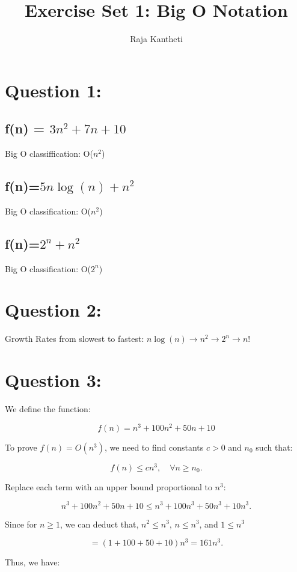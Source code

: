 \documentclass[12pt]{article}
\begin{document}
\title{Exercise Set 1: Big O Notation}
\author{Raja Kantheti}
\date{}
\maketitle

\section{Question 1: }
\subsection*{ f(n) = $3n^2 + 7n + 10$}
Big O classiffication: O($n^2$)
\subsection*{f(n)=$5n\log(n)+n^2$}
Big O classification: O($n^2$)
\subsection*{f(n)=$2^n + n^2$}
Big O classification: O($2^n$)

\section{Question 2: }
Growth Rates from slowest to fastest:
$n\log(n) \longrightarrow n^2 \longrightarrow 2^n \longrightarrow n!$

\section{Question 3: }

We define the function:

\[
f(n) = n^3 + 100n^2 + 50n + 10
\]

To prove \( f(n) = O(n^3) \), we need to find constants \( c > 0 \) and \( n_0 \) such that:

\[
f(n) \leq c n^3, \quad \forall n \geq n_0.
\]

Replace each term with an upper bound proportional to \( n^3 \):

\[
n^3 + 100n^2 + 50n + 10 \leq n^3 + 100n^3 + 50n^3 + 10n^3.
\]

Since for \( n \geq 1 \), we can deduct that, \( n^2 \leq n^3 \), \( n \leq n^3 \), and \( 1 \leq n^3 \)

\[
= (1 + 100 + 50 + 10)n^3 = 161n^3.
\]

Thus, we have:
\end{document}
